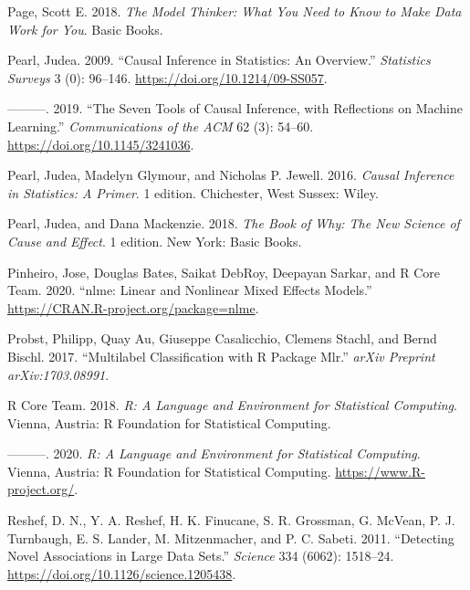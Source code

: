 \documentclass[
]{book}
\newlength{\cslhangindent}
\newenvironment{cslreferences}%
  {\setlength{\parindent}{0pt}%
  \everypar{\setlength{\hangindent}{\cslhangindent}}\ignorespaces}%
  {\par}
\begin{document}
\begin{cslreferences}
\leavevmode\hypertarget{ref-pageModelThinkerWhat2018}{}%
Page, Scott E. 2018. \emph{The Model Thinker: What You Need to Know to Make Data Work for You}. Basic Books.

\leavevmode\hypertarget{ref-pearlCausalInferenceStatistics2009}{}%
Pearl, Judea. 2009. ``Causal Inference in Statistics: An Overview.'' \emph{Statistics Surveys} 3 (0): 96--146. \url{https://doi.org/10.1214/09-SS057}.

\leavevmode\hypertarget{ref-pearlSevenToolsCausal2019}{}%
---------. 2019. ``The Seven Tools of Causal Inference, with Reflections on Machine Learning.'' \emph{Communications of the ACM} 62 (3): 54--60. \url{https://doi.org/10.1145/3241036}.

\leavevmode\hypertarget{ref-pearlCausalInferenceStatistics2016}{}%
Pearl, Judea, Madelyn Glymour, and Nicholas P. Jewell. 2016. \emph{Causal Inference in Statistics: A Primer}. 1 edition. Chichester, West Sussex: Wiley.

\leavevmode\hypertarget{ref-pearlBookWhyNew2018}{}%
Pearl, Judea, and Dana Mackenzie. 2018. \emph{The Book of Why: The New Science of Cause and Effect}. 1 edition. New York: Basic Books.

\leavevmode\hypertarget{ref-R-nlme}{}%
Pinheiro, Jose, Douglas Bates, Saikat DebRoy, Deepayan Sarkar, and R Core Team. 2020. ``nlme: Linear and Nonlinear Mixed Effects Models.'' \url{https://CRAN.R-project.org/package=nlme}.

\leavevmode\hypertarget{ref-R-multilabel}{}%
Probst, Philipp, Quay Au, Giuseppe Casalicchio, Clemens Stachl, and Bernd Bischl. 2017. ``Multilabel Classification with R Package Mlr.'' \emph{arXiv Preprint arXiv:1703.08991}.

\leavevmode\hypertarget{ref-rcoreteamLanguageEnvironmentStatistical2018}{}%
R Core Team. 2018. \emph{R: A Language and Environment for Statistical Computing}. Vienna, Austria: R Foundation for Statistical Computing.

\leavevmode\hypertarget{ref-R-base}{}%
---------. 2020. \emph{R: A Language and Environment for Statistical Computing}. Vienna, Austria: R Foundation for Statistical Computing. \url{https://www.R-project.org/}.

\leavevmode\hypertarget{ref-reshefDetectingNovelAssociations2011}{}%
Reshef, D. N., Y. A. Reshef, H. K. Finucane, S. R. Grossman, G. McVean, P. J. Turnbaugh, E. S. Lander, M. Mitzenmacher, and P. C. Sabeti. 2011. ``Detecting Novel Associations in Large Data Sets.'' \emph{Science} 334 (6062): 1518--24. \url{https://doi.org/10.1126/science.1205438}.


\end{cslreferences}
\end{document}
